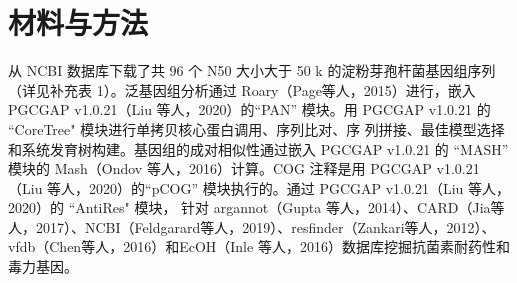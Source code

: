 \documentclass[UTF8]{ctexart}
\begin{document}
\section{材料与方法}
从 NCBI 数据库下载了共 96 个 N50 大小大于 50 k 的淀粉芽孢杆菌基因组序列（详见补充表 1）。泛基因组分析通过 Roary（Page等人，2015）进行，嵌入 PGCGAP v1.0.21（Liu 等人，2020）的``PAN'' 模块。用 PGCGAP v1.0.21 的 ``CoreTree" 模块进行单拷贝核心蛋白调用、序列比对、序 列拼接、最佳模型选择和系统发育树构建。基因组的成对相似性通过嵌入 PGCGAP v1.0.21 的 ``MASH''  模块的 Mash（Ondov 等人，2016）计算。COG 注释是用 PGCGAP v1.0.21（Liu 等人，2020）的``pCOG'' 模块执行的。通过 PGCGAP v1.0.21（Liu 等人，2020）的 ``AntiRes" 模块，  针对 argannot（Gupta 等人，2014）、CARD（Jia等人，2017）、NCBI（Feldgarard等人，2019）、resfinder（Zankari等人，2012）、vfdb（Chen等人，2016）和EcOH（Inle  等人，2016）数据库挖掘抗菌素耐药性和毒力基因。
\end{document}
